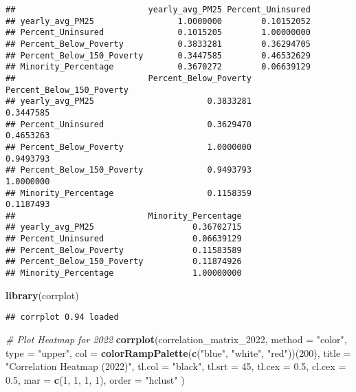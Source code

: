 \documentclass[
]{article}
\newenvironment{Shaded}{\begin{snugshade}}{\end{snugshade}}
\newcommand{\AttributeTok}[1]{\textcolor[rgb]{0.13,0.29,0.53}{#1}}
\newcommand{\CommentTok}[1]{\textcolor[rgb]{0.56,0.35,0.01}{\textit{#1}}}
\newcommand{\DecValTok}[1]{\textcolor[rgb]{0.00,0.00,0.81}{#1}}
\newcommand{\FloatTok}[1]{\textcolor[rgb]{0.00,0.00,0.81}{#1}}
\newcommand{\FunctionTok}[1]{\textcolor[rgb]{0.13,0.29,0.53}{\textbf{#1}}}
\newcommand{\NormalTok}[1]{#1}
\newcommand{\StringTok}[1]{\textcolor[rgb]{0.31,0.60,0.02}{#1}}
\begin{document}
\begin{verbatim}
##                           yearly_avg_PM25 Percent_Uninsured
## yearly_avg_PM25                 1.0000000        0.10152052
## Percent_Uninsured               0.1015205        1.00000000
## Percent_Below_Poverty           0.3833281        0.36294705
## Percent_Below_150_Poverty       0.3447585        0.46532629
## Minority_Percentage             0.3670272        0.06639129
##                           Percent_Below_Poverty Percent_Below_150_Poverty
## yearly_avg_PM25                       0.3833281                 0.3447585
## Percent_Uninsured                     0.3629470                 0.4653263
## Percent_Below_Poverty                 1.0000000                 0.9493793
## Percent_Below_150_Poverty             0.9493793                 1.0000000
## Minority_Percentage                   0.1158359                 0.1187493
##                           Minority_Percentage
## yearly_avg_PM25                    0.36702715
## Percent_Uninsured                  0.06639129
## Percent_Below_Poverty              0.11583589
## Percent_Below_150_Poverty          0.11874926
## Minority_Percentage                1.00000000
\end{verbatim}

\begin{Shaded}
\begin{Highlighting}[]
\FunctionTok{library}\NormalTok{(corrplot)}
\end{Highlighting}
\end{Shaded}

\begin{verbatim}
## corrplot 0.94 loaded
\end{verbatim}

\begin{Shaded}
\begin{Highlighting}[]
\CommentTok{\# Plot Heatmap for 2022}
\FunctionTok{corrplot}\NormalTok{(correlation\_matrix\_2022, }
         \AttributeTok{method =} \StringTok{"color"}\NormalTok{, }
         \AttributeTok{type =} \StringTok{"upper"}\NormalTok{, }
         \AttributeTok{col =} \FunctionTok{colorRampPalette}\NormalTok{(}\FunctionTok{c}\NormalTok{(}\StringTok{"blue"}\NormalTok{, }\StringTok{"white"}\NormalTok{, }\StringTok{"red"}\NormalTok{))(}\DecValTok{200}\NormalTok{),}
         \AttributeTok{title =} \StringTok{"Correlation Heatmap (2022)"}\NormalTok{, }
         \AttributeTok{tl.col =} \StringTok{"black"}\NormalTok{, }
         \AttributeTok{tl.srt =} \DecValTok{45}\NormalTok{, }
         \AttributeTok{tl.cex =} \FloatTok{0.5}\NormalTok{,}
         \AttributeTok{cl.cex =} \FloatTok{0.5}\NormalTok{, }
         \AttributeTok{mar =} \FunctionTok{c}\NormalTok{(}\DecValTok{1}\NormalTok{, }\DecValTok{1}\NormalTok{, }\DecValTok{1}\NormalTok{, }\DecValTok{1}\NormalTok{), }
         \AttributeTok{order =} \StringTok{"hclust"}
\NormalTok{)}
\end{Highlighting}
\end{Shaded}
\end{document}
